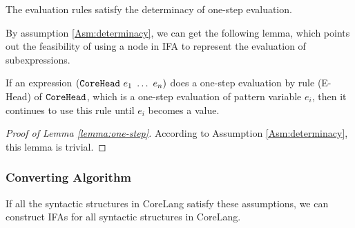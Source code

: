 \begin{Asm}
    \label{Asm:determinacy}
    The evaluation rules satisfy the determinacy of one-step evaluation.
\end{Asm}

By assumption \ref{Asm:determinacy}, we can get the following lemma, which points out the feasibility of using a node in IFA to represent the evaluation of subexpressions.

\begin{lemma}
    \label{lemma:one-step}
    If an expression $(\mbox{\tt CoreHead}~e_1~\ldots~e_n)$ does a one-step evaluation by rule (E-Head) of $\mbox{\tt CoreHead}$, which is a one-step evaluation of pattern variable $e_i$, then it continues to use this rule until $e_i$ becomes a value.
\end{lemma}

\begin{proof}[Proof of Lemma \ref{lemma:one-step}]
    According to Assumption \ref{Asm:determinacy}, this lemma is trivial.
\end{proof}

\subsubsection{Converting Algorithm}

\begin{mythm}
    \label{mythm:Rule2IFA}
    If all the syntactic structures in CoreLang satisfy these assumptions, we can construct IFAs for all syntactic structures in CoreLang.
\end{mythm}

